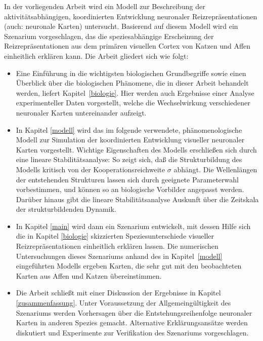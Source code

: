 In der vorliegenden Arbeit wird ein Modell zur Beschreibung der
aktivitätsabhängigen, koordinierten Entwicklung neuronaler
Reizrepräsentationen (auch: neuronale Karten) untersucht.  Basierend auf
diesem Modell wird ein Szenarium vorgeschlagen, das die speziesabhängige
Erscheinung der Reizrepräsentationen aus dem primären visuellen Cortex
von Katzen und Affen einheitlich erklären kann.  Die Arbeit gliedert sich
wie folgt:

\begin{itemize}
\item Eine Einführung in die wichtigsten biologischen Grundbegriffe sowie
einen Über\-blick über die biologischen Phänomene, die in dieser Arbeit
behandelt werden, liefert Kapitel~\ref{biologie}. Hier werden auch
Ergebnisse einer Analyse experimenteller Daten vorgestellt, welche die
Wechselwirkung verschiedener neuronaler Karten untereinander aufzeigt.

\item In Kapitel \ref{modell} wird das im folgende verwendete,
phänomenologische Modell zur Simulation der koordinierten Entwicklung
visueller neuronaler Karten vorgestellt. Wichtige Eigenschaften des Modells
erschließen sich durch eine lineare Stabilitätsanalyse: So zeigt sich,
daß die Strukturbildung des Modells kritisch von der
Kooperationsreichweite $\sigma$ abhängt.  Die Wellenlängen der
entstehenden Strukturen lassen sich durch geeignete Parameterwahl
vorbestimmen, und können so an biologische Vorbilder angepasst werden.
Darüber hinaus gibt die lineare Stabilitätsanalyse Auskunft über die
Zeitskala der strukturbildenden Dynamik.

\item In Kapitel \ref{main} wird dann ein Szenarium entwickelt, mit dessen
Hilfe sich die in Kapitel \ref{biologie} skizzierten Speziesunterschiede
visueller Reizrepräsentationen einheitlich erklären lassen.  Die
numerischen Untersuchungen dieses Szenariums anhand des in
Kapitel~\ref{modell} eingeführten Modells ergeben Karten, die sehr gut mit
den beobachteten Karten aus Affen und Katzen übereinstimmen.

\item Die Arbeit schließt mit einer Diskussion der Ergebnisse in Kapitel
\ref{zusammenfassung}. Unter Voraussetzung der Allgemeingültigkeit des
Szenariums werden Vorhersagen über die Entstehungsreihenfolge neuronaler
Karten in anderen Spezies gemacht. Alternative Erklärungsansätze werden
diskutiert und Experimente zur Verifikation des Szenariums vorgeschlagen.
\end{itemize}
